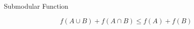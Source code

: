 \begin{frame}{Submodular Function}
    
    {\huge$$f(A \cup B) + f(A \cap B) \leq f(A) + f(B)$$}
\end{frame}